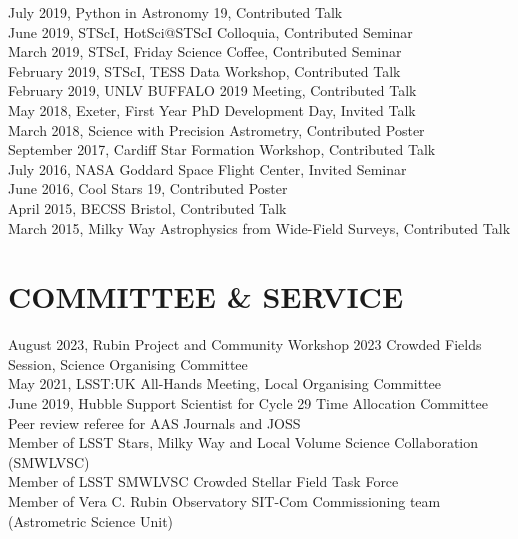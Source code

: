 \documentclass[letter, margin, 10pt]{res} %
\begin{document}
\begin{resume}
July 2019, Python in Astronomy 19, Contributed Talk\\
June 2019, STScI, HotSci@STScI Colloquia, Contributed Seminar\\
March 2019, STScI, Friday Science Coffee, Contributed Seminar\\
February 2019, STScI, TESS Data Workshop, Contributed Talk\\
February 2019, UNLV BUFFALO 2019 Meeting, Contributed Talk\\
May 2018, Exeter, First Year PhD Development Day, Invited Talk\\
March 2018, Science with Precision Astrometry, Contributed Poster\\
September 2017, Cardiff Star Formation Workshop, Contributed Talk\\
July 2016, NASA Goddard Space Flight Center, Invited Seminar\\
June 2016, Cool Stars 19, Contributed Poster\\
April 2015, BECSS Bristol, Contributed Talk\\
March 2015, Milky Way Astrophysics from Wide-Field Surveys, Contributed Talk

 \vspace{-6pt}
\section{COMMITTEE \& SERVICE}

August 2023, Rubin Project and Community Workshop 2023 Crowded Fields Session, Science Organising Committee\\
May 2021, LSST:UK All-Hands Meeting, Local Organising Committee\\
June 2019, Hubble Support Scientist for Cycle 29 Time Allocation Committee\\
Peer review referee for AAS Journals and JOSS\\
Member of LSST Stars, Milky Way and Local Volume Science Collaboration (SMWLVSC)\\
Member of LSST SMWLVSC Crowded Stellar Field Task Force\\
Member of Vera C. Rubin Observatory SIT-Com Commissioning team (Astrometric Science Unit)\\

 \vspace{-6pt}

\end{resume}
\end{document}
